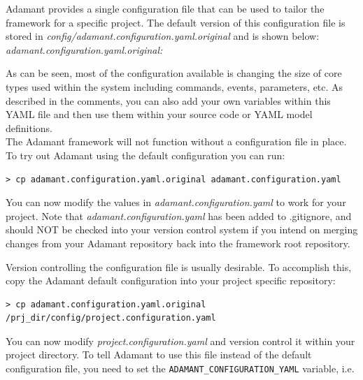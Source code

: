 Adamant provides a single configuration file that can be used to tailor the framework for a specific project. The default version of this configuration file is stored in \textit{config/adamant.configuration.yaml.original} and is shown below: \\

\textit{adamant.configuration.yaml.original:}

As can be seen, most of the configuration available is changing the size of core types used within the system including commands, events, parameters, etc. As described in the comments, you can also add your own variables within this YAML file and then use them within your source code or YAML model definitions. \\

The Adamant framework will not function without a configuration file in place. To try out Adamant using the default configuration you can run:

\vspace{5mm} %
\begin{verbatim}
> cp adamant.configuration.yaml.original adamant.configuration.yaml
\end{verbatim}
\vspace{5mm} %

You can now modify the values in \textit{adamant.configuration.yaml} to work for your project. Note that \textit{adamant.configuration.yaml} has been added to .gitignore, and should NOT be checked into your version control system if you intend on merging changes from your Adamant repository back into the framework root repository.

Version controlling the configuration file is usually desirable. To accomplish this, copy the Adamant default configuration into your project specific repository:

\vspace{5mm} %
\begin{verbatim}
> cp adamant.configuration.yaml.original /prj_dir/config/project.configuration.yaml
\end{verbatim}
\vspace{5mm} %

You can now modify \textit{project.configuration.yaml} and version control it within your project directory. To tell Adamant to use this file instead of the default configuration file, you need to set the \texttt{ADAMANT\_CONFIGURATION\_YAML} variable, i.e.

